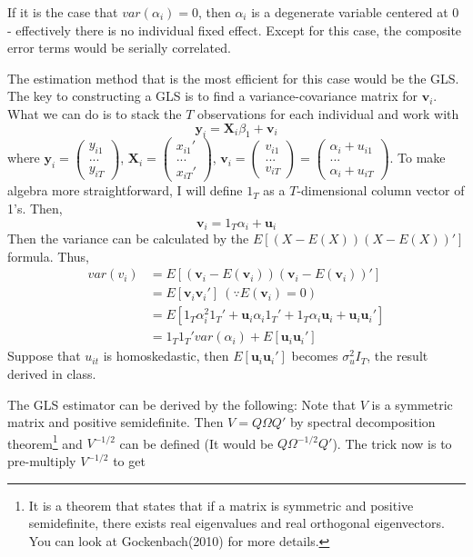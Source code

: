 If it is the case that $var(\alpha_i)=0$, then $\alpha_i$ is a degenerate variable centered at 0 - effectively there is no individual fixed effect. Except for this case, the composite error terms would be serially correlated. \par
The estimation method that is the most efficient for this case would be the GLS. The key to constructing a GLS is to find a variance-covariance matrix for $\mathbf{v}_i$. What we can do is to stack the $T$ observations for each individual and work with
\[
\mathbf{y}_ i = \mathbf{X}_i\beta_1 + \mathbf{v}_i
\]
where $\mathbf{y}_i = \begin{pmatrix}y_{i1} \\ ... \\ y_{iT} \end{pmatrix}$, $\mathbf{X}_i=\begin{pmatrix}x_{i1}' \\ ... \\ x_{iT}' \end{pmatrix}$,  $\mathbf{v}_i = \begin{pmatrix}v_{i1} \\ ... \\ v_{iT} \end{pmatrix}=\begin{pmatrix}\alpha_i+u_{i1} \\ ... \\ \alpha_i+u_{iT} \end{pmatrix}$. To make algebra more straightforward, I will define $1_T$ as a $T$-dimensional column vector of 1's.  Then,
\[
\mathbf{v}_i = 1_T\alpha_i + \mathbf{u}_i
\]
Then the variance can be calculated by the $E[(X-E(X))(X-E(X))']$ formula. Thus,
\begin{align*}
var(v_i)&=E[(\mathbf{v}_i-E(\mathbf{v}_i))(\mathbf{v}_i-E(\mathbf{v}_i))']\\
&=E[\mathbf{v}_i\mathbf{v}_i'] \ (\because E(\mathbf{v}_i)=0)\\
&=E\left[1_T\alpha_i^2 1_T' + \mathbf{u}_i\alpha_i 1_T'+1_T\alpha_i \mathbf{u}_i + \mathbf{u}_i\mathbf{u}_i' \right]\\
&=1_T1_T'var(\alpha_i)+E[ \mathbf{u}_i\mathbf{u}_i' ]
\end{align*} 
Suppose that $u_{it}$ is homoskedastic, then $E[ \mathbf{u}_i\mathbf{u}_i' ]$ becomes $\sigma_u^2 I_T$, the result derived in class. \par
The GLS estimator can be derived by the following: Note that $V$ is a symmetric matrix and positive semidefinite. Then $V=Q\Omega Q'$ by spectral decomposition theorem\footnote{It is a theorem that states that if a matrix is symmetric and positive semidefinite, there exists real eigenvalues and real orthogonal eigenvectors. You can look at Gockenbach(2010) for more details. } and $V^{-1/2}$ can be defined (It would be $Q\Omega^{-1/2}Q'$). The trick now is to pre-multiply $V^{-1/2}$ to get
